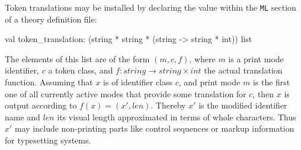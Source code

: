 \medskip Token translations may be installed by declaring the
 value within the \texttt{ML} section of a
theory definition file:
\begin{ttbox}
val token_translation: (string * string * (string -> string * int)) list
\end{ttbox}
The elements of this list are of the form $(m, c, f)$, where $m$ is a
print mode identifier, $c$ a token class, and $f\colon string \to
string \times int$ the actual translation function.  Assuming that $x$
is of identifier class $c$, and print mode $m$ is the first one of all
currently active modes that provide some translation for $c$, then $x$
is output according to $f(x) = (x', len)$.  Thereby $x'$ is the
modified identifier name and $len$ its visual length approximated in
terms of whole characters.  Thus $x'$ may include non-printing parts
like control sequences or markup information for typesetting systems.




